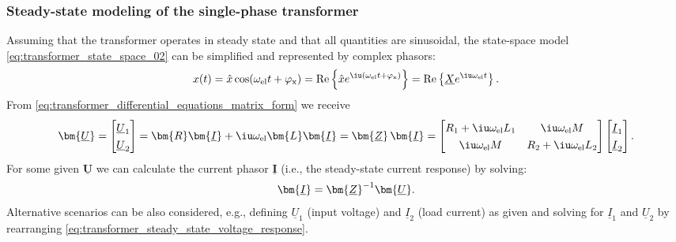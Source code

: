 \begin{frame}
	\frametitle{Steady-state modeling of the single-phase transformer}
		Assuming that the transformer operates in steady state and that all quantities are sinusoidal, the state-space model \eqref{eq:transformer_state_space_02} can be simplified and represented by complex phasors:
			$$x(t) = \hat{x} \cos(\omega_\mathrm{el} t+ \varphi_{\mathrm{x}}) = \mathrm{Re}\left\{\hat{x} e^{\iu (\omega_\mathrm{el} t + \varphi_{\mathrm{x}})}\right\}= \mathrm{Re}\left\{\underline{X} e^{\iu \omega_\mathrm{el} t}\right\}.$$
			\pause
		From \eqref{eq:transformer_differential_equations_matrix_form} we receive
		\begin{align}
			\bm{\underline{U}} = \begin{bmatrix} \underline{U}_1 \\ \underline{U}_2 \end{bmatrix} = \bm{R}\bm{\underline{I}} + \iu \omega_\mathrm{el} \bm{L}\bm{\underline{I}} = \bm{\underline{Z}}\, \bm{\underline{I} } = \begin{bmatrix} R_1 + \iu \omega_\mathrm{el} L_1 & \iu \omega_\mathrm{el} M \\ \iu \omega_\mathrm{el} M & R_2 + \iu \omega_\mathrm{el} L_2 \end{bmatrix} \begin{bmatrix} \underline{I}_1 \\ \underline{I}_2 \end{bmatrix}.
			\label{eq:transformer_steady_state_voltage_response}
		\end{align}
		\pause
		For some given $\bm{\underline{U}}$ we can calculate the current phasor $\bm{\underline{I}}$ (i.e., the steady-state current response) by solving:
		\begin{align}
			\renewcommand*{\arraystretch}{1.3} 
			\bm{\underline{I}} = \bm{\underline{Z}}^{-1} \bm{\underline{U}} .
			\label{eq:transformer_steady_state_current_response}
		\end{align}
		\pause
		Alternative scenarios can be also considered, e.g., defining $\underline{U}_1$ (input voltage) and $\underline{I}_2$ (load current) as given and solving for $\underline{I}_1$ and $\underline{U}_2$ by rearranging \eqref{eq:transformer_steady_state_voltage_response}. 
\end{frame}

